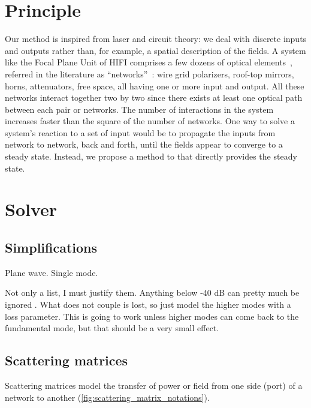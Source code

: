 \section{Principle}
Our method is inspired from laser and circuit theory: we deal with discrete inputs and outputs rather than, for example, a spatial description of the fields.
A system like the Focal Plane Unit of HIFI comprises a few dozens of optical elements~\cite{jackson2002hifi}, referred in the literature as ``networks''~\cite{siegman1986lasers}: wire grid polarizers, roof-top mirrors, horns, attenuators, free space, all having one or more input and output.
All these networks interact together two by two since there exists at least one optical path between each pair or networks.
The number of interactions in the system increases faster than the square of the number of networks.
One way to solve a system's reaction to a set of input would be to propagate the inputs from network to network, back and forth, until the fields appear to converge to a steady state.
Instead, we propose a method to that directly provides the steady state.

\section{Solver}

\subsection{Simplifications}

Plane wave.
Single mode.

Not only a list, I must justify them.
Anything below -40 dB can pretty much be ignored .
What does not couple is lost, so just model the higher modes with a loss parameter.
This is going to work unless higher modes can come back to the fundamental mode, but that should be a very small effect.





\subsection{Scattering matrices}
Scattering matrices \cite{siegman1986lasers} model the transfer of power or field from one side (port) of a network to another (\cref{fig:scattering_matrix_notations}).

